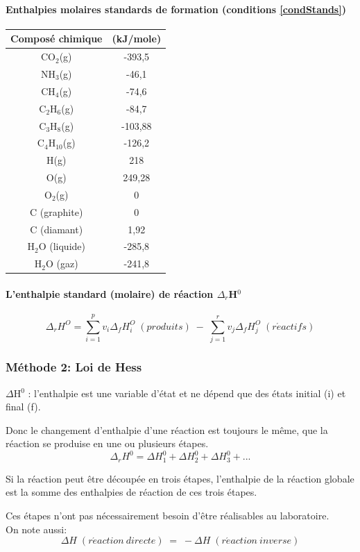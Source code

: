 \documentclass[10pt,a4paper]{book}
\begin{document}
\paragraph{Enthalpies molaires standards de formation (conditions \ref{condStands})} \label{standard_formation_enthalpy}
\begin{center}
\begin{tabular}{| c | c |}
\hline
\textbf{Composé chimique} & \textbf{(kJ/mole)} \\
\hline
CO$_2$(g) & -393,5 \\
\hline
NH$_3$(g) & -46,1 \\
\hline
CH$_4$(g) & -74,6 \\
\hline
C$_2$H$_6$(g) & -84,7 \\
\hline
C$_3$H$_8$(g) & -103,88 \\
\hline
C$_4$H$_{10}$(g) & -126,2 \\
\hline
H(g) & 218 \\
\hline
O(g) & 249,28 \\
\hline
O$_2$(g) & 0 \\
\hline
C (graphite) & 0 \\
\hline
C (diamant) & 1,92 \\
\hline
H$_2$O (liquide) & -285,8 \\
\hline
H$_2$O (gaz) & -241,8 \\
\hline
\end{tabular}
\end{center}
\paragraph{L'enthalpie standard (molaire) de réaction $\Delta_r$H$^0$}
\begin{displaymath}
\Delta_r H^O = \sum^p_{i=1}v_i\Delta_f H_i^O \; (produits) \; - \; \sum^r_{j=1}v_j\Delta_f H_j^O \; (r\acute{e}actifs)
\end{displaymath}

\subsubsection{Méthode 2: Loi de Hess}

$\Delta$H$^0$ : l’enthalpie est une variable d’état et ne dépend que des états initial (i) et final (f). \par
Donc le changement d’enthalpie d’une réaction est toujours le même, que la réaction se produise en une ou plusieurs étapes.
\begin{displaymath}
\Delta_r H^0 = \Delta H_1^0 + \Delta H_2^0 + \Delta H_3^0 +...
\end{displaymath} \par
Si la réaction peut être découpée en trois étapes, l’enthalpie
de la réaction globale est la somme des enthalpies de réaction
de ces trois étapes. \par
Ces étapes n’ont pas nécessairement besoin d’être réalisables
au laboratoire. \\
On note aussi:
\begin{displaymath}
\Delta H \; (r\acute{e}action \: directe) \; = \; - \Delta H \; (r\acute{e}action \: inverse)
\end{displaymath}
\end{document}

